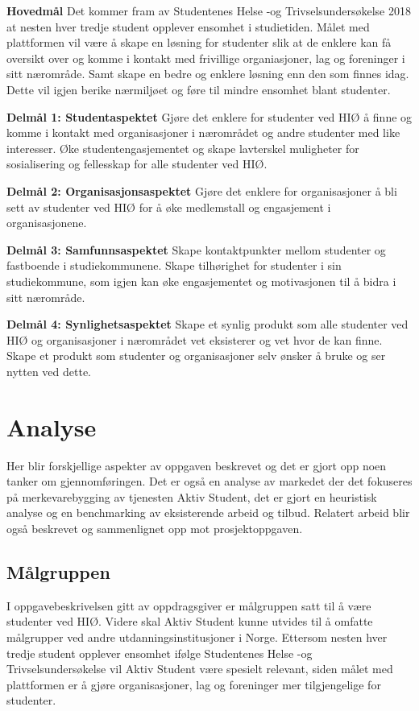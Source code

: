 \begin{compactitem}
\item [{\bf Hovedmål}] Det kommer fram av Studentenes Helse -og Trivselsundersøkelse 2018 at nesten hver tredje student opplever ensomhet i studietiden. \cite{SHOT:2} Målet med plattformen vil være å skape en løsning for studenter slik at de enklere kan få oversikt over og komme i kontakt med frivillige organiasjoner, lag og foreninger i sitt nærområde. Samt skape en bedre og enklere løsning enn den som finnes idag. Dette vil igjen berike nærmiljøet og føre til mindre ensomhet blant studenter.
\begin{compactitem}
\item [{\bf  Delmål 1: Studentaspektet} ] Gjøre det enklere for studenter ved HIØ å finne og komme i kontakt med organisasjoner i nærområdet og andre studenter med like interesser. Øke studentengasjementet og skape lavterskel muligheter for sosialisering og fellesskap for alle studenter ved HIØ.
\item [{\bf  Delmål 2: Organisasjonsaspektet} ] Gjøre det enklere for organisasjoner å bli sett av studenter ved HIØ for å øke medlemstall og engasjement i organisasjonene.
\item [{\bf  Delmål 3: Samfunnsaspektet} ] Skape kontaktpunkter mellom studenter og fastboende i studiekommunene. Skape tilhørighet for studenter i sin studiekommune, som igjen kan øke engasjementet og motivasjonen til å bidra i sitt nærområde.
\item [{\bf  Delmål 4: Synlighetsaspektet} ] Skape et synlig produkt som alle studenter ved HIØ og organisasjoner i nærområdet vet eksisterer og vet hvor de kan finne. Skape et produkt som studenter og organisasjoner selv ønsker å bruke og ser nytten ved dette.
\end{compactitem} 
\end{compactitem}

\section{Analyse}
Her blir forskjellige aspekter av oppgaven beskrevet og det er gjort opp noen tanker om gjennomføringen. Det er også en analyse av markedet der det fokuseres på merkevarebygging av tjenesten Aktiv Student, det er gjort en heuristisk analyse og en benchmarking av eksisterende arbeid og tilbud. Relatert arbeid blir også beskrevet og sammenlignet opp mot prosjektoppgaven.

\subsection{Målgruppen}
I oppgavebeskrivelsen gitt av oppdragsgiver er målgruppen satt til å være studenter ved HIØ. Videre skal Aktiv Student kunne utvides til å omfatte målgrupper ved andre utdanningsinstitusjoner i Norge. 
Ettersom nesten hver tredje student opplever ensomhet ifølge Studentenes Helse -og Trivselsundersøkelse \cite{SHOT:2} vil Aktiv Student være spesielt relevant, siden målet med plattformen er å gjøre organisasjoner, lag og foreninger mer tilgjengelige for studenter.

